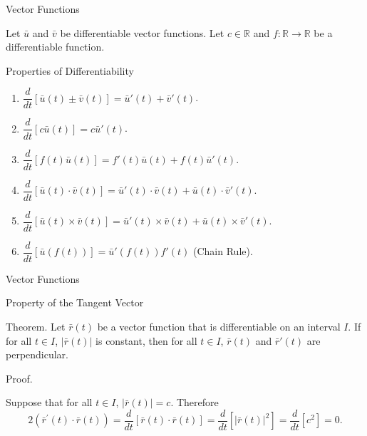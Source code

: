 \documentclass[aspectratio=169, UTF8]{ctexbeamer}
\begin{document}
    \begin{frame}[t]{Vector Functions}
        \par Let $\bar{u}$ and $\bar{v}$ be differentiable vector functions. Let $c \in \mathbb{R}$ and $f: \mathbb{R} \to \mathbb{R}$ be a differentiable function.
        \begin{block}{Properties of Differentiability}
            \begin{enumerate}
                \item $\dfrac{d}{dt} [\bar{u} (t) \pm \bar{v} (t)] = \bar{u}'(t) + \bar{v}'(t)$.
                \item $\dfrac{d}{dt} [c \bar{u}(t)] = c \bar{u}'(t)$.
                \item $\dfrac{d}{dt} [ f(t) \bar{u} (t)] = f'(t) \bar{u}(t) + f(t) \bar{u}'(t)$.
                \item $\dfrac{d}{dt} [\bar{u} (t) \cdot \bar{v} (t)] = \bar{u}'(t) \cdot \bar{v}(t) + \bar{u} (t) \cdot \bar{v}'(t)$.
                \item $\dfrac{d}{dt} [\bar{u} (t) \times \bar{v} (t)] = \bar{u}'(t) \times \bar{v}(t) + \bar{u} (t) \times \bar{v}'(t)$.
                \item $\dfrac{d}{dt} [\bar{u} (f(t))] = \bar{u}'(f(t)) f'(t)$ (Chain Rule).
            \end{enumerate}
        \end{block}
    \end{frame}

    \begin{frame}[t]{Vector Functions}
        \begin{block}{Property of the Tangent Vector}
            \par \textcolor{yy}{Theorem.} Let $\bar{r} (t)$ be a vector function that is differentiable on an interval $I$. If for all $t \in I$, $|\bar{r} (t) |$ is constant, then for all $t \in I$, $\bar{r}(t)$ and $\bar{r}'(t)$ are perpendicular. 
        \end{block}

        \phantom{zjy}

        \par \textcolor{yy}{Proof.} 
        \par Suppose that for all $t \in I$, $|\bar{r} (t)| = c$. Therefore 
        \begin{equation*}
            2\left(\bar{r}^{\prime}(t) \cdot \bar{r}(t)\right)=\frac{d}{d t}[\bar{r}(t) \cdot \bar{r}(t)]=\frac{d}{d t}\left[|\bar{r}(t)|^{2}\right]=\frac{d}{d t}\left[c^{2}\right]=0 .
        \end{equation*}
    \end{frame}
\end{document}
